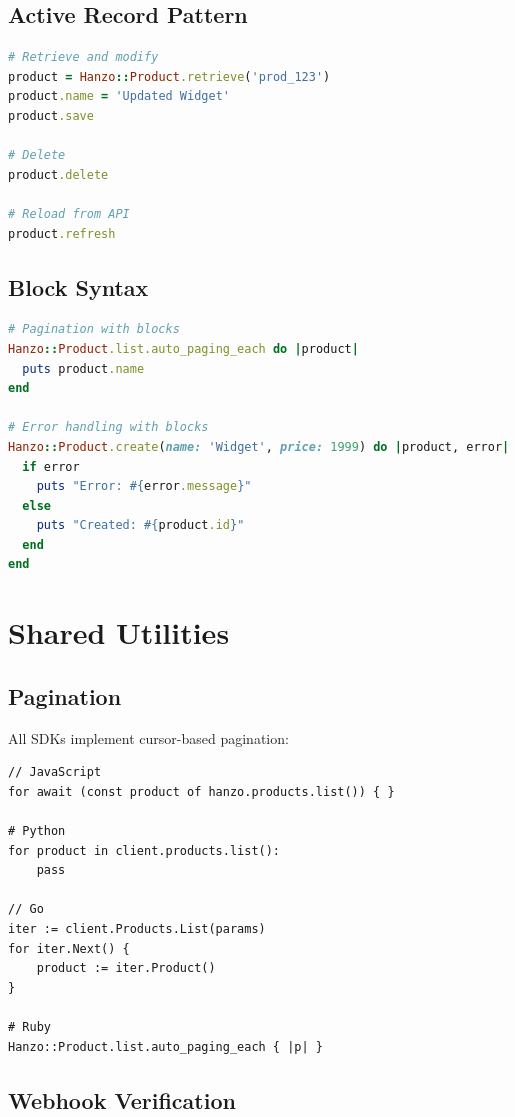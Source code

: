 \documentclass[11pt,a4paper]{article}
\begin{document}
\subsection{Active Record Pattern}

\begin{lstlisting}[language=Ruby, caption=Ruby Active Record Style]
# Retrieve and modify
product = Hanzo::Product.retrieve('prod_123')
product.name = 'Updated Widget'
product.save

# Delete
product.delete

# Reload from API
product.refresh
\end{lstlisting}

\subsection{Block Syntax}

\begin{lstlisting}[language=Ruby, caption=Ruby Block Syntax]
# Pagination with blocks
Hanzo::Product.list.auto_paging_each do |product|
  puts product.name
end

# Error handling with blocks
Hanzo::Product.create(name: 'Widget', price: 1999) do |product, error|
  if error
    puts "Error: #{error.message}"
  else
    puts "Created: #{product.id}"
  end
end
\end{lstlisting}

\section{Shared Utilities}

\subsection{Pagination}

All SDKs implement cursor-based pagination:

\begin{lstlisting}[caption=Pagination Pattern]
// JavaScript
for await (const product of hanzo.products.list()) { }

# Python
for product in client.products.list():
    pass

// Go
iter := client.Products.List(params)
for iter.Next() {
    product := iter.Product()
}

# Ruby
Hanzo::Product.list.auto_paging_each { |p| }
\end{lstlisting}

\subsection{Webhook Verification}
\end{document}
